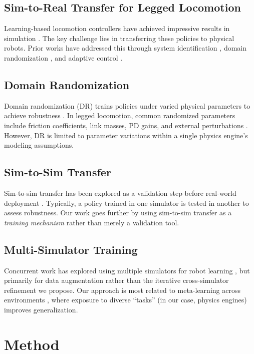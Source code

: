 \documentclass[conference]{IEEEtran}
\begin{document}
\subsection{Sim-to-Real Transfer for Legged Locomotion}
Learning-based locomotion controllers have achieved impressive results in simulation \cite{hwangbo2019learning, lee2020learning, rudin2022learning}. The key challenge lies in transferring these policies to physical robots. Prior works have addressed this through system identification \cite{tan2018sim}, domain randomization \cite{peng2018sim}, and adaptive control \cite{kumar2021rma}.

\subsection{Domain Randomization}
Domain randomization (DR) trains policies under varied physical parameters to achieve robustness \cite{tobin2017domain}. In legged locomotion, common randomized parameters include friction coefficients, link masses, PD gains, and external perturbations \cite{rudin2022learning}. However, DR is limited to parameter variations within a single physics engine's modeling assumptions.

\subsection{Sim-to-Sim Transfer}
Sim-to-sim transfer has been explored as a validation step before real-world deployment \cite{muratore2022robot}. Typically, a policy trained in one simulator is tested in another to assess robustness. Our work goes further by using sim-to-sim transfer as a \textit{training mechanism} rather than merely a validation tool.

\subsection{Multi-Simulator Training}
Concurrent work has explored using multiple simulators for robot learning \cite{chen2024multi}, but primarily for data augmentation rather than the iterative cross-simulator refinement we propose. Our approach is most related to meta-learning across environments \cite{finn2017model}, where exposure to diverse ``tasks'' (in our case, physics engines) improves generalization.

\section{Method}
\end{document}
